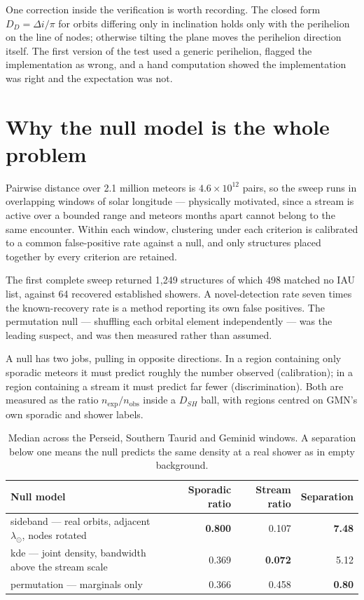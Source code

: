 \documentclass[11pt,a4paper]{report}
\begin{document}
One correction inside the verification is worth recording. The closed form
$D_D = \Delta i / \pi$ for orbits differing only in inclination holds only with the perihelion
on the line of nodes; otherwise tilting the plane moves the perihelion direction itself. The
first version of the test used a generic perihelion, flagged the implementation as wrong, and
a hand computation showed the implementation was right and the expectation was not.

\section{Why the null model is the whole problem}

Pairwise distance over 2.1 million meteors is $4.6\times10^{12}$ pairs, so the sweep runs in
overlapping windows of solar longitude --- physically motivated, since a stream is active over
a bounded range and meteors months apart cannot belong to the same encounter. Within each
window, clustering under each criterion is calibrated to a common false-positive rate against a
null, and only structures placed together by every criterion are retained.

The first complete sweep returned 1{,}249 structures of which 498 matched no IAU list, against
64 recovered established showers. A novel-detection rate seven times the known-recovery rate is
a method reporting its own false positives. The permutation null --- shuffling each orbital
element independently --- was the leading suspect, and was then measured rather than assumed.

A null has two jobs, pulling in opposite directions. In a region containing only sporadic
meteors it must predict roughly the number observed (calibration); in a region containing a
stream it must predict far fewer (discrimination). Both are measured as the ratio
$n_{\text{exp}}/n_{\text{obs}}$ inside a $D_{SH}$ ball, with regions centred on GMN's own
sporadic and shower labels.

\begin{table}[h]
\centering
\small
\begin{tabular}{lrrr}
\toprule
Null model & Sporadic ratio & Stream ratio & Separation \\
\midrule
sideband --- real orbits, adjacent $\lambda_\odot$, nodes rotated & \textbf{0.800} & 0.107 & \textbf{7.48} \\
kde --- joint density, bandwidth above the stream scale & 0.369 & \textbf{0.072} & 5.12 \\
permutation --- marginals only & 0.366 & 0.458 & \textbf{0.80} \\
\bottomrule
\end{tabular}
\caption{Median across the Perseid, Southern Taurid and Geminid windows. A separation below
one means the null predicts the same density at a real shower as in empty background.}
\end{table}
\end{document}
